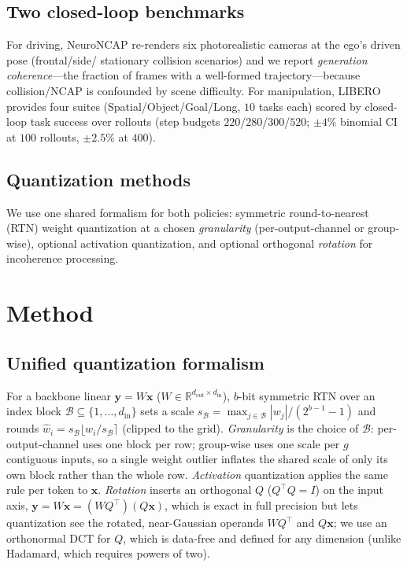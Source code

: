 \documentclass[conference]{IEEEtran}
\begin{document}
\subsection{Two closed-loop benchmarks}
For driving, NeuroNCAP re-renders six photorealistic cameras at the ego's driven pose (frontal/side/
stationary collision scenarios) and we report \emph{generation coherence}---the fraction of frames
with a well-formed trajectory---because collision/NCAP is confounded by scene difficulty. For
manipulation, LIBERO provides four suites (Spatial/Object/Goal/Long, $10$ tasks each) scored by
closed-loop task success over rollouts (step budgets $220$/$280$/$300$/$520$; $\pm4\%$ binomial CI at
$100$ rollouts, $\pm2.5\%$ at $400$).

\subsection{Quantization methods}
We use one shared formalism for both policies: symmetric round-to-nearest (RTN) weight quantization at
a chosen \emph{granularity} (per-output-channel or group-wise), optional activation quantization, and
optional orthogonal \emph{rotation} for incoherence processing.

\section{Method}
\subsection{Unified quantization formalism}
For a backbone linear $\mathbf{y}=W\mathbf{x}$ ($W\in\mathbb{R}^{d_\text{out}\times d_\text{in}}$),
$b$-bit symmetric RTN over an index block $\mathcal{B}\subseteq\{1,\dots,d_\text{in}\}$ sets a scale
$s_\mathcal{B}=\max_{j\in\mathcal{B}}|w_j|/(2^{b-1}-1)$ and rounds
$\widehat w_i=s_\mathcal{B}\lfloor w_i/s_\mathcal{B}\rceil$ (clipped to the grid). \emph{Granularity}
is the choice of $\mathcal{B}$: per-output-channel uses one block per row; group-wise uses one scale
per $g$ contiguous inputs, so a single weight outlier inflates the shared scale of only its own block
rather than the whole row. \emph{Activation} quantization applies the same rule per token to
$\mathbf{x}$. \emph{Rotation} inserts an orthogonal $Q$ ($Q^\top Q=I$) on the input axis,
$\mathbf{y}=W\mathbf{x}=(WQ^\top)(Q\mathbf{x})$, which is exact in full precision but lets quantization
see the rotated, near-Gaussian operands $WQ^\top$ and $Q\mathbf{x}$; we use an orthonormal DCT for
$Q$, which is data-free and defined for any dimension (unlike Hadamard, which requires powers of two).
\end{document}
